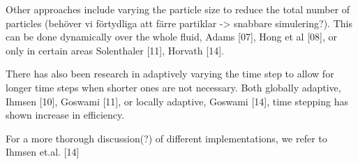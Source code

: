 \documentclass[../../main.tex]{subfiles}
\begin{document}
Other approaches include varying the particle size to reduce the total number of particles (behöver vi förtydliga att färre partiklar -> snabbare simulering?). This can be done dynamically over the whole fluid, Adams [07], Hong et al [08], or only in certain areas Solenthaler [11], Horvath [14]. 

There has also been research in adaptively varying the time step to allow for longer time steps when shorter ones are not necessary. Both globally adaptive, Ihmsen [10], Goswami [11], or locally adaptive, Goswami [14], time stepping has shown increase in efficiency. 

For a more thorough discussion(?) of different implementations, we refer to Ihmsen et.al. [14]
\end{document}
